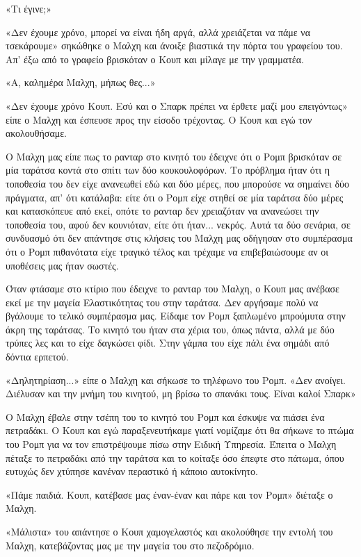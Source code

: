 \documentclass[12pt,twoside, openany]{book}
\begin{document}
«Τι έγινε;»

«Δεν έχουμε χρόνο, μπορεί να είναι ήδη αργά, αλλά χρειάζεται να πάμε να τσεκάρουμε» σηκώθηκε ο Μαλχη και άνοιξε βιαστικά την πόρτα του γραφείου του. Απ’ έξω από το γραφείο βρισκόταν ο Κουπ και μίλαγε με την γραμματέα.

«Α, καλημέρα Μαλχη, μήπως θες...»

«Δεν έχουμε χρόνο Κουπ. Εσύ και ο Σπαρκ πρέπει να έρθετε μαζί μου επειγόντως» είπε ο Μαλχη και έσπευσε προς την είσοδο τρέχοντας. Ο Κουπ και εγώ τον ακολουθήσαμε.

Ο Μαλχη μας είπε πως το ρανταρ στο κινητό του έδειχνε ότι ο Ρομπ βρισκόταν σε μία ταράτσα κοντά στο σπίτι των δύο κουκουλοφόρων. Το πρόβλημα ήταν ότι η τοποθεσία του δεν είχε ανανεωθεί εδώ και δύο μέρες, που μπορούσε να σημαίνει δύο πράγματα, απ’ ότι κατάλαβα: είτε ότι ο Ρομπ είχε στηθεί σε μία ταράτσα δύο μέρες και κατασκόπευε από εκεί, οπότε το ρανταρ δεν χρειαζόταν να ανανεώσει την τοποθεσία του, αφού δεν κουνιόταν, είτε ότι ήταν... νεκρός. Αυτά τα δύο σενάρια, σε συνδυασμό ότι δεν απάντησε στις κλήσεις του Μαλχη μας οδήγησαν στο συμπέρασμα ότι ο Ρομπ πιθανότατα είχε τραγικό τέλος και τρέχαμε να επιβεβαιώσουμε αν οι υποθέσεις μας ήταν σωστές. 

Όταν φτάσαμε στο κτίριο που έδειχνε το ρανταρ του Μαλχη, ο Κουπ μας ανέβασε εκεί με την μαγεία Ελαστικότητας του στην ταράτσα. Δεν αργήσαμε πολύ να βγάλουμε το τελικό συμπέρασμα μας. Είδαμε τον Ρομπ ξαπλωμένο μπρούμυτα στην άκρη της ταράτσας. Το κινητό του ήταν στα χέρια του, όπως πάντα, αλλά με δύο τρύπες λες και το είχε δαγκώσει φίδι. Στην γάμπα του είχε πάλι ένα σημάδι από δόντια ερπετού.

«Δηλητηρίαση...» είπε ο Μαλχη και σήκωσε το τηλέφωνο του Ρομπ. «Δεν ανοίγει. Διέλυσαν και την μνήμη του κινητού, μη βρίσω το σπανάκι τους. Είναι καλοί Σπαρκ»

Ο Μαλχη έβαλε στην τσέπη του το κινητό του Ρομπ και έσκυψε να πιάσει ένα πετραδάκι. Ο Κουπ και εγώ παραξενευτήκαμε γιατί νομίζαμε ότι θα σήκωνε το πτώμα του Ρομπ για να τον επιστρέψουμε πίσω στην Ειδική Υπηρεσία. Έπειτα ο Μαλχη πέταξε το πετραδάκι από την ταράτσα και το κοίταξε όσο έπεφτε στο πάτωμα, όπου ευτυχώς δεν χτύπησε κανέναν περαστικό ή κάποιο αυτοκίνητο.

«Πάμε παιδιά. Κουπ, κατέβασε μας έναν-έναν και πάρε και τον Ρομπ» διέταξε ο Μαλχη.

«Μάλιστα» του απάντησε ο Κουπ χαμογελαστός και ακολούθησε την εντολή του Μαλχη, κατεβάζοντας μας με την μαγεία του στο  πεζοδρόμιο.\\\\
\end{document}

